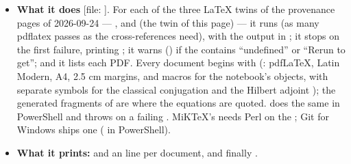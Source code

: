 \begin{itemize}
  \item \textbf{What it does} [file: ]. For each of the three LaTeX twins of the provenance pages of 2026-09-24 --- ,  and  (the twin of this page) --- it runs  (as many pdflatex passes as the cross-references need), with the output in ; it stops on the first failure, printing ; it warns () if the  contains ``undefined'' or ``Rerun to get''; and it lists each PDF. Every document begins with  (: pdfLaTeX, Latin Modern, A4, 2.5 cm margins, and macros for the notebook's objects, with separate symbols for the classical conjugation  and the Hilbert adjoint ); the generated fragments of  are  where the equations are quoted.  does the same in PowerShell and throws on a failing . MiKTeX's  needs Perl on the ; Git for Windows ships one ( in PowerShell).
  \item \textbf{What it prints:}  and an  line per document, and finally .

\end{itemize}
